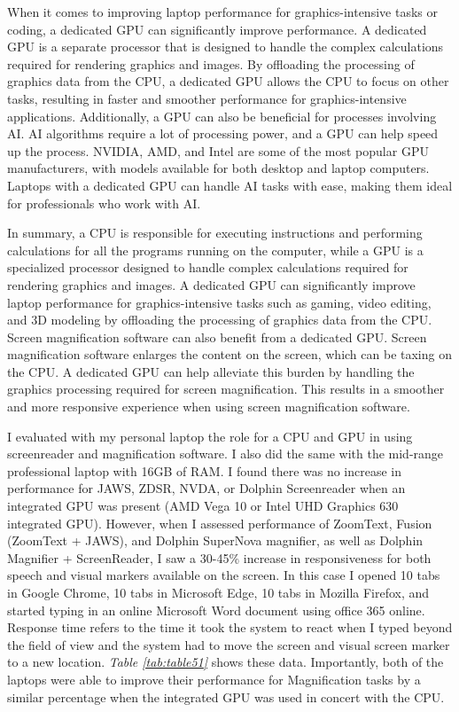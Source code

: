  When it comes to improving laptop performance for graphics-intensive tasks or coding, a dedicated GPU can significantly improve performance. A dedicated GPU is a separate processor that is designed to handle the complex calculations required for rendering graphics and images. By offloading the processing of graphics data from the CPU, a dedicated GPU allows the CPU to focus on other tasks, resulting in faster and smoother performance for graphics-intensive applications. Additionally, a GPU can also be beneficial for processes involving AI. AI algorithms require a lot of processing power, and a GPU can help speed up the process. NVIDIA, AMD, and Intel are some of the most popular GPU manufacturers, with models available for both desktop and laptop computers. Laptops with a dedicated GPU can handle AI tasks with ease, making them ideal for professionals who work with AI.
 
 In summary, a CPU is responsible for executing instructions and performing calculations for all the programs running on the computer, while a GPU is a specialized processor designed to handle complex calculations required for rendering graphics and images. A dedicated GPU can significantly improve laptop performance for graphics-intensive tasks such as gaming, video editing, and 3D modeling by offloading the processing of graphics data from the CPU. Screen magnification software can also benefit from a dedicated GPU. Screen magnification software enlarges the content on the screen, which can be taxing on the CPU. A dedicated GPU can help alleviate this burden by handling the graphics processing required for screen magnification. This results in a smoother and more responsive experience when using screen magnification software.
 
 I evaluated with my personal laptop the role for a CPU and GPU in using screenreader and magnification software. I also did the same with the mid-range professional laptop with 16GB of RAM. I found there was no increase in performance for JAWS, ZDSR, NVDA, or Dolphin Screenreader when an integrated GPU was present (AMD Vega 10 or Intel UHD Graphics 630 integrated GPU). However, when I assessed performance of ZoomText, Fusion (ZoomText + JAWS), and Dolphin SuperNova magnifier, as well as Dolphin Magnifier + ScreenReader, I saw a 30-45\% increase in responsiveness for both speech and visual markers available on the screen. In this case I opened 10 tabs in Google Chrome, 10 tabs in Microsoft Edge, 10 tabs in Mozilla Firefox, and started typing in an online Microsoft Word document using office 365 online. Response time refers to the time it took the system to react when I typed beyond the field of view and the system had to move the screen and visual screen marker to a new location. \textit{Table \ref{tab:table51}} shows these data. Importantly, both of the laptops were able to improve their performance for Magnification tasks by a similar percentage when the integrated GPU was used in concert with the CPU.
 
